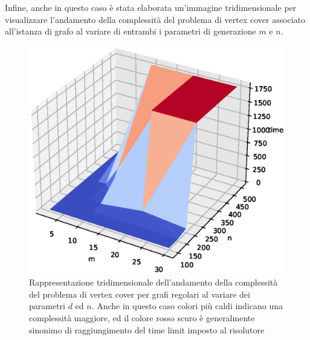 Infine, anche in questo caso è stata elaborata un'immagine tridimensionale per visualizzare l'andamento della complessità del problema di vertex cover associato all'istanza di grafo al variare di entrambi i parametri di generazione $m$ e $n$.
\begin{figure}[h!]
     \centering
       \includegraphics[scale=0.5]{images/bag-3d.eps}
       \caption{Rappresentazione tridimensionale dell'andamento della complessità del problema di vertex cover per grafi regolari al variare dei parametri $d$ ed $n$. Anche in questo caso colori più caldi indicano una complessità maggiore, ed il colore rosso scuro è generalmente sinonimo di raggiungimento del time limit imposto al risolutore}      
        \label{fig:bag3d}
\end{figure}